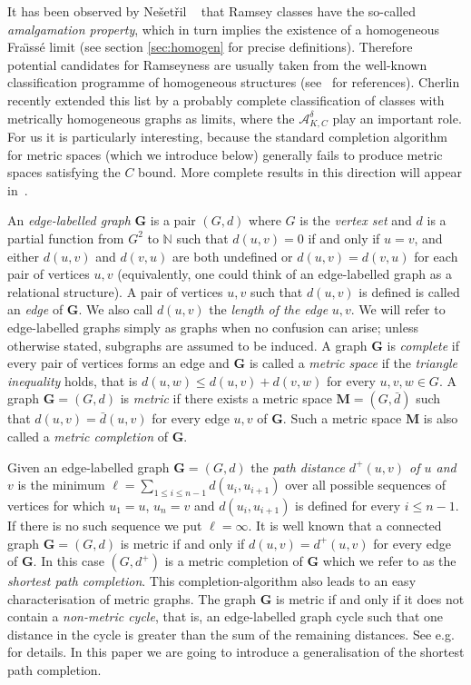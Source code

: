 \documentclass[11pt]{amsart}
\def\str#1{\mathbf {#1}}
\def\Fraisse{Fra\"{\i}ss\' e}
\def\role{role}
\begin{document}
\medskip

It has been observed by Ne\v set\v ril ~\cite{Nevsetvril1989a,Nevsetril2005,Kechris2005}
 that Ramsey classes have the so-called {\it amalgamation property}, which in turn implies the existence of a homogeneous \Fraisse{} limit (see section \ref{sec:homogen} for precise definitions). Therefore potential candidates for Ramseyness are usually taken from the well-known classification programme of homogeneous structures 
(see~\cite{Cherlin2013} for references). Cherlin recently extended
this list by a probably complete classification of classes with metrically homogeneous graphs as limits, where the 
$\mathcal A^\delta_{K,C}$ play an important \role{}.  For us it is particularly interesting, because the standard completion algorithm for metric spaces (which we introduce below) generally fails to produce metric spaces satisfying the $C$ bound. More complete results in this direction will appear in~\cite{Aranda2017}.

An {\em edge-labelled graph} $\str{G}$ is a pair $(G,d)$ where $G$ is the {\em vertex
set} and $d$ is a partial function from $G^2$ to $\mathbb N$ such that $d(u,v)=0$ if and only if $u=v$, and either $d(u,v)$ and $d(v,u)$ are both undefined or $d(u,v)=d(v,u)$ for each pair of vertices $u,v$ (equivalently, one could think of an edge-labelled graph as a relational structure). A pair of vertices $u,v$ such that $d(u,v)$ is defined is called an {\em edge} of $\str{G}$. We also call $d(u,v)$ the {\em length of the edge} $u,v$. We will refer to edge-labelled graphs simply as graphs when no confusion can arise; unless otherwise stated, subgraphs are assumed to be induced. 
A graph $\str{G}$ is {\em complete} if every pair of vertices
forms an edge and $\str{G}$ is called a {\em metric space} if the {\em triangle inequality} holds,
that is $d(u,w)\leq d(u,v)+d(v,w)$ for every $u,v,w\in G$.
A graph $\str{G}=(G,d)$ is {\em metric} if there exists a metric
space $\str{M}=(G,\bar{d})$ such that $d(u,v)=\bar{d}(u,v)$ for every edge $u,v$ of $\str{G}$.
Such a metric space $\str{M}$ is also called a {\em metric completion} of
$\str{G}$.

Given an edge-labelled graph $\str{G}=(G,d)$ the {\em path distance $d^+(u,v)$ of $u$ and $v$} is the minimum $\ell=\sum_{1\leq i\leq n-1}d(u_i,u_{i+1})$ over all possible sequences of vertices for which $u_1=u$, $u_n=v$ and $d(u_i,u_{i+1})$ is defined for every $i\leq n-1$. If there is no such sequence we put $\ell=\infty$.
It is well known that a connected graph $\str{G}=(G,d)$ is metric if and only if
$d(u,v)=d^+(u,v)$ for every edge of $\str{G}$. In this case $(G,d^+)$ is a metric completion of $\str{G}$
which we refer to as the {\em shortest path completion}.
This completion-algorithm also leads to an easy
characterisation of metric graphs. The graph $\str{G}$ is metric if and only if it does not contain a {\em non-metric cycle}, 
that is, an edge-labelled graph cycle such that one distance in the cycle is greater than the sum of the remaining distances. See e.g.~\cite{Hubicka2016} for details.
  In this paper we are going to introduce a generalisation of the shortest path completion.
\end{document}
